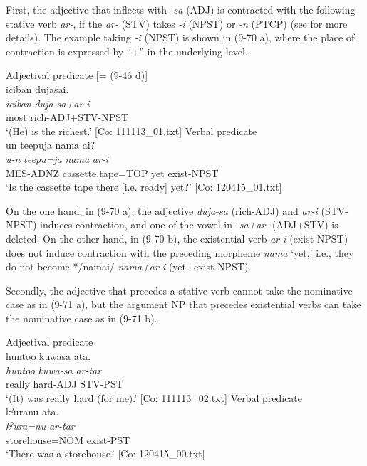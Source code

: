 First, the adjective that inflects with \textit{{}-sa} (ADJ) is contracted with the following stative verb \textit{ar-}, if the \textit{ar-} (STV) takes \textit{{}-i} (NPST) or \textit{-n} (PTCP) (see  for more details). The example taking \textit{{}-i} (NPST) is shown in (9-70 a), where the place of contraction is expressed by “+” in the underlying level.

\ea   \label{ex:9.70}
\ea Adjectival predicate [= (9-46 d)]\\
    \glll  {\textbar}iciban{\textbar}  dujasai.\\
      \textit{iciban}  \textit{duja-sa+ar-i}\\
      most  rich-ADJ+STV-NPST\\
      \glt       ‘(He) is the richest.’ [Co: 111113\_01.txt]
\ex Verbal predicate\\
    \glll  un  {\textbar}teepu{\textbar}ja  nama  ai?\\
      \textit{u-n}  \textit{teepu=ja}  \textit{nama}  \textit{ar-i}\\
      MES-ADNZ  cassette.tape=TOP  yet  exist-NPST\\
      \glt       ‘Is the cassette tape there [i.e. ready] yet?’ [Co: 120415\_01.txt]
    \z
\z

On the one hand, in (9-70 a), the adjective \textit{duja-sa} (rich-ADJ) and \textit{ar-i} (STV-NPST) induces contraction, and one of the vowel in \textit{{}-sa+ar-} (ADJ+STV) is deleted. On the other hand, in (9-70 b), the existential verb \textit{ar-i} (exist-NPST) does not induce contraction with the preceding morpheme \textit{nama} ‘yet,’ i.e., they do not become */namai/ \textit{nama+ar-i} (yet+exist-NPST).

Secondly, the adjective that precedes a stative verb cannot take the nominative case as in (9-71 a), but the argument NP that precedes existential verbs can take the nominative case as in (9-71 b).

\ea    \label{ex:9.71}
 \ea Adjectival predicate\\
    \glll  huntoo  kuwasa  ata.\\
      \textit{huntoo}  \textit{kuwa-sa}  \textit{ar-tar}\\
      really  hard-ADJ  STV-PST\\
      \glt       ‘(It) was really hard (for me).’ [Co: 111113\_02.txt]
 \ex Verbal predicate\\
    \glll  kˀuranu  ata.\\
      \textit{kˀura=nu}  \textit{ar-tar}\\
      storehouse=NOM  exist-PST\\
      \glt       ‘There was a storehouse.’ [Co: 120415\_00.txt]
    \z
\z

